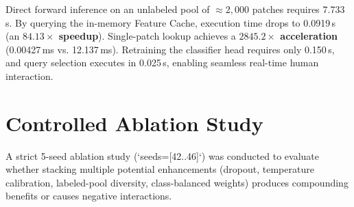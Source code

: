 \documentclass[conference,letterpaper]{IEEEtran}
\begin{document}
\begin{table}[!t]
\centering
\caption{Computational Parameter and Latency Profiling}
\label{tab:computational_profile}
\end{table}

Direct forward inference on an unlabeled pool of $\approx 2,000$ patches requires 7.733\,s. By querying the in-memory Feature Cache, execution time drops to 0.0919\,s (an \textbf{$84.13\times$ speedup}). Single-patch lookup achieves a \textbf{$2845.2\times$ acceleration} (0.00427\,ms vs. 12.137\,ms). Retraining the classifier head requires only 0.150\,s, and query selection executes in 0.025\,s, enabling seamless real-time human interaction.

\section{Controlled Ablation Study}

A strict 5-seed ablation study (`seeds=[42..46]`) was conducted to evaluate whether stacking multiple potential enhancements (dropout, temperature calibration, labeled-pool diversity, class-balanced weights) produces compounding benefits or causes negative interactions.
\end{document}
